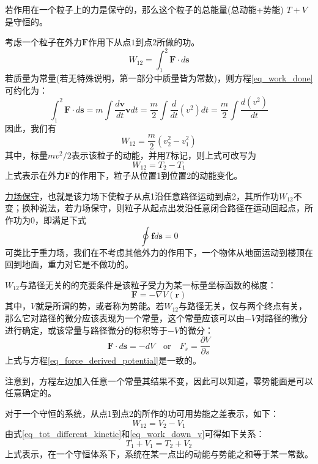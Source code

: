 \vspace{5pt}
\begin{theorem}[能量守恒原理]
	若作用在一个粒子上的力是保守的，那么这个粒子的总能量(总动能+势能) $T+V$是守恒的。
\end{theorem}
考虑一个粒子在外力$\bm{F}$作用下从点$1$到点$2$所做的功。
\begin{equation}
	W_{12} = \int_{1}^{2} \bm{F} \cdot d\bm{s}	\label{eq_work_done}
\end{equation}
若质量为常量(若无特殊说明，第一部分中质量皆为常数)，则方程\eqref{eq_work_done}可约化为：
\begin{equation}
	\int_{1}^{2} \bm{F} \cdot d\bm{s} = m \int \frac{d\bm{v}}{dt}\bm{v} dt = \frac{m}{2} \int \frac{d}{dt}(v^2) dt = \frac{m}{2} \int \frac{d(v^2)}{dt} 
\end{equation}
因此，我们有
\begin{equation}
	W_{12} = \frac{m}{2}(v_2^2 - v_1^2)
\end{equation}
其中，标量$mv^2/2$表示该粒子的动能，并用$T$标记，则上式可改写为
\begin{equation}
	W_{12} = T_2 - T_1	\label{eq_tot_different_kinetic}
\end{equation} 
上式表示在外力$\bm{F}$的作用下，粒子从位置1到位置2的动能变化。
\begin{note}
	\underline{力场保守}，也就是该力场下使粒子从点1沿任意路径运动到点2，其所作功$W_{12}$不变；换种说法，若力场保守，则粒子从起点出发沿任意闭合路径在运动回起点，所作功为0，即满足下式
	\begin{equation}
		\oint \bm{f} d\bm{s} = 0	\label{eq_force_circuit_path}
	\end{equation} 
	可类比于重力场，我们在不考虑其他外力的作用下，一个物体从地面运动到楼顶在回到地面，重力对它是不做功的。
\end{note}
$W_{12}$与路径无关的的充要条件是该粒子受力为某一标量坐标函数的梯度：
\begin{equation}
	\bm{F} = - \nabla V(\bm{r})	\label{eq_force_derived_potential}
\end{equation} 
其中，$V$就是所谓的势，或者称为势能。若$W_{12}$与路径无关，仅与两个终点有关，那么它对路径的微分应该表现为一个常量，这个常量应该可以由$-V$对路径的微分进行确定，或该常量与路径微分的标积等于$-V$的微分：
\begin{equation*}
	\bm{F} \cdot d \bm{s} = -d V  \quad \text{or} \quad F_{s} = \frac{\partial V}{\partial s}
\end{equation*} 
上式与方程\eqref{eq_force_derived_potential}是一致的。
\begin{note}
	注意到，方程左边加入任意一个常量其结果不变，因此可以知道，零势能面是可以任意确定的。
\end{note}
对于一个守恒的系统，从点1到点2的所作的功可用势能之差表示，如下：
\begin{equation}
	W_{12} = V_2 - V_1	\label{eq_work_down_v}
\end{equation} 
由式\eqref{eq_tot_different_kinetic}和\eqref{eq_work_down_v}可得如下关系：
\begin{equation}
	T_1 + V_1 = T_2 + V_2	\label{eq_energy_conservation}
\end{equation} 
上式表示，在一个守恒体系下，系统在某一点出的动能与势能之和等于某一常数。

